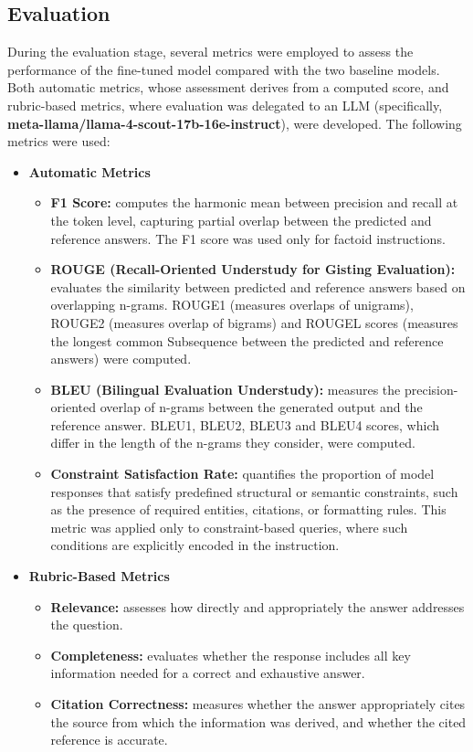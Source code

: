 \subsection{Evaluation}
\label{subsec:eval}
During the evaluation stage, several metrics were employed to assess the performance of the fine-tuned model compared with the two baseline models. Both automatic metrics, whose assessment derives from a computed score, and rubric-based metrics, where evaluation was delegated to an LLM (specifically, \textbf{meta-llama/llama-4-scout-17b-16e-instruct}), were developed. The following metrics were used:
\begin{itemize}
    \item \textbf{Automatic Metrics}
    \begin{itemize}
        \item \textbf{F1 Score:} computes the harmonic mean between precision and recall at the token level, capturing partial overlap between the predicted and reference answers. The F1 score was used only for factoid instructions.
        \item \textbf{ROUGE (Recall-Oriented Understudy for Gisting Evaluation):} \cite{rouge} evaluates the similarity between predicted and reference answers based on overlapping n-grams. ROUGE1 (measures overlaps of unigrams), ROUGE2 (measures overlap of bigrams) and ROUGEL scores (measures the longest common Subsequence between the predicted and reference answers) were computed.
        \item \textbf{BLEU (Bilingual Evaluation Understudy):} \cite{bleu} measures the precision-oriented overlap of n-grams between the generated output and the reference answer. BLEU1, BLEU2, BLEU3 and BLEU4 scores, which differ in the length of the n-grams they consider, were computed.
        \item \textbf{Constraint Satisfaction Rate:} quantifies the proportion of model responses that satisfy predefined structural or semantic constraints, such as the presence of required entities, citations, or formatting rules. This metric was applied only to constraint-based queries, where such conditions are explicitly encoded in the instruction.
    \end{itemize}
    \item \textbf{Rubric-Based Metrics}
    \begin{itemize}
        \item \textbf{Relevance:} assesses how directly and appropriately the answer addresses the question.
        \item \textbf{Completeness:} evaluates whether the response includes all key information needed for a correct and exhaustive answer.
        \item \textbf{Citation Correctness:} measures whether the answer appropriately cites the source from which the information was derived, and whether the cited reference is accurate.
    \end{itemize}
\end{itemize}
